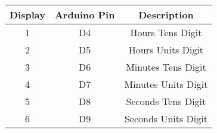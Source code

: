 \begin{tabular}{|c|c|c|}
\hline
Display & Arduino Pin & Description\\
\hline
1  & D4 & Hours Tens Digit\\
\hline
2  & D5 & Hours Units Digit\\
\hline
3  & D6 & Minutes Tens Digit\\
\hline
4  & D7 & Minutes Units Digit\\
\hline
5 & D8 & Seconds Tens Digit\\
\hline
6  & D9 & Seconds Units Digit\\
\hline
\end{tabular}
